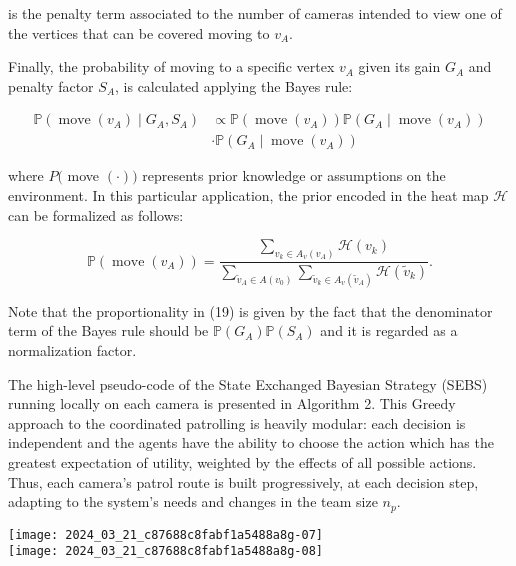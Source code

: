 \documentclass[conference]{IEEEtran}
\begin{document}
is the penalty term associated to the number of cameras intended to view one of the vertices that can be covered moving to $v_{A}$.

Finally, the probability of moving to a specific vertex $v_{A}$ given its gain $G_{A}$ and penalty factor $S_{A}$, is calculated applying the Bayes rule:


\begin{align*}
\mathbb{P}\left(\operatorname{move}\left(v_{A}\right) \mid G_{A}, S_{A}\right) & \propto \mathbb{P}\left(\operatorname{move}\left(v_{A}\right)\right) \mathbb{P}\left(G_{A} \mid \operatorname{move}\left(v_{A}\right)\right) \\
& \cdot \mathbb{P}\left(G_{A} \mid \operatorname{move}\left(v_{A}\right)\right) \tag{19}
\end{align*}


where $P($ move $(\cdot))$ represents prior knowledge or assumptions on the environment. In this particular application, the prior encoded in the heat map $\mathcal{H}$ can be formalized as follows:


\begin{equation*}
\mathbb{P}\left(\operatorname{move}\left(v_{A}\right)\right)=\frac{\sum_{v_{k} \in A_{v}\left(v_{A}\right)} \mathcal{H}\left(v_{k}\right)}{\sum_{\widetilde{v}_{A} \in A\left(v_{0}\right)} \sum_{\widetilde{v}_{k} \in A_{v}\left(\widetilde{v}_{A}\right)} \mathcal{H}\left(\widetilde{v}_{k}\right)} . \tag{20}
\end{equation*}


Note that the proportionality in (19) is given by the fact that the denominator term of the Bayes rule should be $\mathbb{P}\left(G_{A}\right) \mathbb{P}\left(S_{A}\right)$ and it is regarded as a normalization factor.

The high-level pseudo-code of the State Exchanged Bayesian Strategy (SEBS) running locally on each camera is presented in Algorithm 2. This Greedy approach to the coordinated patrolling is heavily modular: each decision is independent and the agents have the ability to choose the action which has the greatest expectation of utility, weighted by the effects of all possible actions. Thus, each camera's patrol route is built progressively, at each decision step, adapting to the system's needs and changes in the team size $n_{p}$.

\texttt{[image: 2024\_03\_21\_c87688c8fabf1a5488a8g-07]}\\
\texttt{[image: 2024\_03\_21\_c87688c8fabf1a5488a8g-08]}
\end{document}
